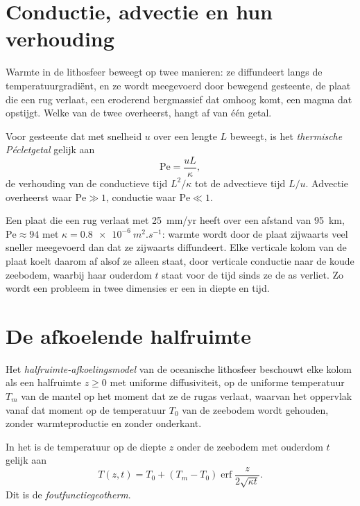 \section{Conductie, advectie en hun verhouding}

Warmte in de lithosfeer beweegt op twee manieren: ze diffundeert langs de
temperatuurgradiënt, en ze wordt meegevoerd door bewegend gesteente, de plaat die een rug verlaat, een
eroderend bergmassief dat omhoog komt, een magma dat opstijgt. Welke van de twee overheerst, hangt af van
één getal.

\begin{definition}\label{def:b3:lithosphere-thermal-models:peclet}
Voor gesteente dat met snelheid $u$ over een lengte $L$ beweegt, is het
\emph{thermische Pécletgetal} gelijk aan
\[
  \mathrm{Pe} = \frac{uL}{\kappa},
\]
de verhouding van de conductieve tijd $L^2/\kappa$ tot de advectieve tijd $L/u$.
Advectie overheerst waar $\mathrm{Pe} \gg 1$, conductie waar
$\mathrm{Pe} \ll 1$.
\end{definition}

Een plaat die een rug verlaat met \qty{25}{mm/yr} heeft over een afstand van
\qty{95}{km}, $\mathrm{Pe} \approx 94$ met $\kappa = \qty{0.8e-6}{m^2.s^{-1}}$:
warmte wordt door de plaat zijwaarts veel sneller meegevoerd dan dat ze zijwaarts diffundeert.
Elke verticale kolom van de plaat koelt daarom af alsof ze alleen staat, door verticale
conductie naar de koude zeebodem, waarbij haar ouderdom $t$ staat voor de tijd sinds ze
de as verliet. Zo wordt een probleem in twee dimensies er een in diepte en
tijd.

\section{De afkoelende halfruimte}

\begin{definition}\label{def:b3:lithosphere-thermal-models:half-space}
Het \emph{halfruimte-afkoelingsmodel} van de
oceanische lithosfeer beschouwt elke kolom als een halfruimte $z \ge 0$ met uniforme
diffusiviteit, op de uniforme temperatuur $T_m$ van de mantel op het moment dat ze
de rugas verlaat, waarvan het oppervlak vanaf dat moment op de temperatuur $T_0$ van de
zeebodem wordt gehouden, zonder warmteproductie en zonder onderkant.
\end{definition}

\begin{theorem}[Foutfunctiegeotherm]\label{thm:b3:lithosphere-thermal-models:erf}
In het  is de temperatuur op de diepte $z$ onder de
zeebodem met ouderdom $t$ gelijk aan
\[
  T(z, t) = T_0 + (T_m - T_0)\operatorname{erf}\frac{z}{2\sqrt{\kappa t}} .
\]
Dit is de \emph{foutfunctiegeotherm}.
\end{theorem}


